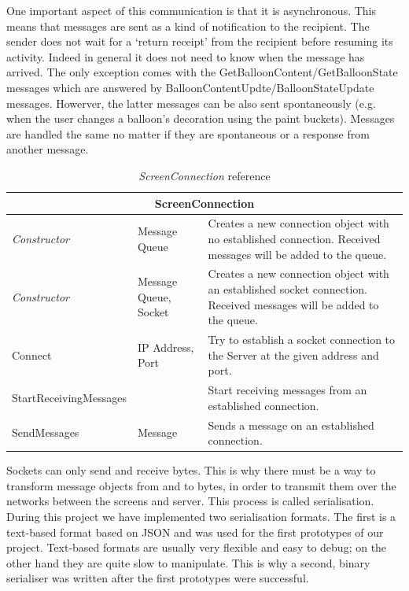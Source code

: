 One important aspect of this communication is that it is asynchronous. This 
means that messages are sent as a kind of notification to the recipient. The 
sender does not wait for a `return receipt' from the recipient before resuming 
its activity. Indeed in general it does not need to know when the message has
arrived. The only exception comes with the GetBalloonContent/GetBalloonState 
messages which are answered by BalloonContentUpdte/BalloonStateUpdate messages.
Howerver, the latter messages can be also sent spontaneously (e.g. when the user 
changes a balloon's decoration using the paint buckets). Messages are handled 
the same no matter if they are spontaneous or a response from another message.

\begin{table}[h]
\begin{tabular}{|p{4.4cm}|p{3.6cm}|p{7.6cm}|}
\hline
\multicolumn{3}{|c|}{ScreenConnection} \\ \hline
\emph{Constructor} & Message Queue & Creates a new connection object with no established connection. 
Received messages will be added to the queue. \\ \hline

\emph{Constructor} & Message Queue, \newline Socket & Creates a new connection 
object with an established socket connection. Received messages will be added to the queue. \\ \hline

Connect & IP Address, \newline Port & Try to establish a socket connection to the Server at the given address and port. \\ \hline

StartReceivingMessages & & Start receiving messages from an established connection. \\ \hline

SendMessages & Message & Sends a message on an established connection. \\ \hline

\end{tabular}

\caption{\emph{ScreenConnection} reference}

\label{ScreenConnRef}
\end{table}

Sockets can only send and receive bytes. This is why there must be a way to
transform message objects from and to bytes, in order to transmit them over the
networks between the screens and server. This process is called serialisation. 
During this project we have implemented two serialisation formats. The first is
a text-based format based on JSON and was used for the first prototypes of our 
project. Text-based formats are usually very flexible and easy to debug; on
the other hand they are quite slow to manipulate. This is why a second, binary
serialiser was written after the first prototypes were successful.


